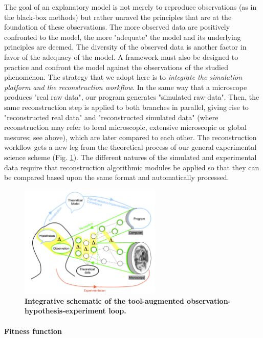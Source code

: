 The goal of an explanatory model is not merely to reproduce observations (as in the black-box methods) but rather unravel the principles that are at the foundation of these observations. The more observed data are positively confronted to the model, the more "adequate" the model and its underlying principles are deemed. The diversity of the observed data is another factor in favor of the adequacy of the model. A framework must also be designed to practice and confront the model against the observations of the studied phenomenon. The strategy that we adopt here is to \textit{integrate the simulation platform and the reconstruction workflow}. In the same way that a microscope produces "real raw data", our program generates "simulated raw data". Then, the same reconstruction step is applied to both branches in parallel, giving rise to "reconstructed real data" and "reconstructed simulated data" (where reconstruction may refer to local microscopic, extensive microscopic or global mesures; see above), which are later compared to each other. The reconstruction workflow gets a new leg from the theoretical process of our general experimental science scheme (Fig. \ref{experimental_science_larger_augmented}). The different natures of the simulated and experimental data require that reconstruction algorithmic modules be applied so that they can be compared based upon the same format and automatically processed.
\begin{figure}
\begin{center}
\includegraphics[width=0.6\textwidth]{../../images/experimental_science/experimental_science_larger_augmented.png}
\end{center}
\caption{\textbf{Integrative schematic of the tool-augmented observation-hypothesis-experiment loop.}}
\label{experimental_science_larger_augmented}
\end{figure}

\paragraph{Fitness function}


